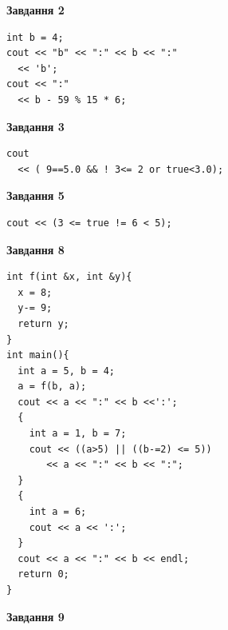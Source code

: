 \documentclass[12pt, ukrainian]{article}
\begin{document}
{\begin {large}
\begin{minipage}[t]{7.0cm}
\end{minipage}
\vline \hspace{1mm}
\begin{minipage}[t]{11.0cm}

\begin{center}
\textbf{Завдання 2}
\end{center}
\vspace{-8mm}

\begin{verbatim}
int b = 4;
cout << "b" << ":" << b << ":" 
  << 'b';
cout << ":" 
  << b - 59 % 15 * 6;
\end{verbatim}



\begin{center}
\textbf{Завдання 3}
\end{center}
\vspace{-8mm}

\begin{verbatim}
cout 
  << ( 9==5.0 && ! 3<= 2 or true<3.0);
\end{verbatim}



\begin{center}
\textbf{Завдання 5}
\end{center}
\vspace{-8mm}

\begin{verbatim}
cout << (3 <= true != 6 < 5);
\end{verbatim}



\begin{center}
\textbf{Завдання 8}
\end{center}
\vspace{-8mm}

\begin{verbatim}
int f(int &x, int &y){
  x = 8;
  y-= 9;
  return y;
}
int main(){
  int a = 5, b = 4;
  a = f(b, a);
  cout << a << ":" << b <<':';
  {
    int a = 1, b = 7;
    cout << ((a>5) || ((b-=2) <= 5))
       << a << ":" << b << ":";
  }
  {
    int a = 6;
    cout << a << ':';
  }
  cout << a << ":" << b << endl;
  return 0;
}
\end{verbatim}

\end{minipage}


\begin{minipage}[t]{7.0cm}

\begin{center}
\textbf{Завдання 9}
\end{center}
\vspace{-8mm}


\end{minipage}
\end{large}}
\end{document}
